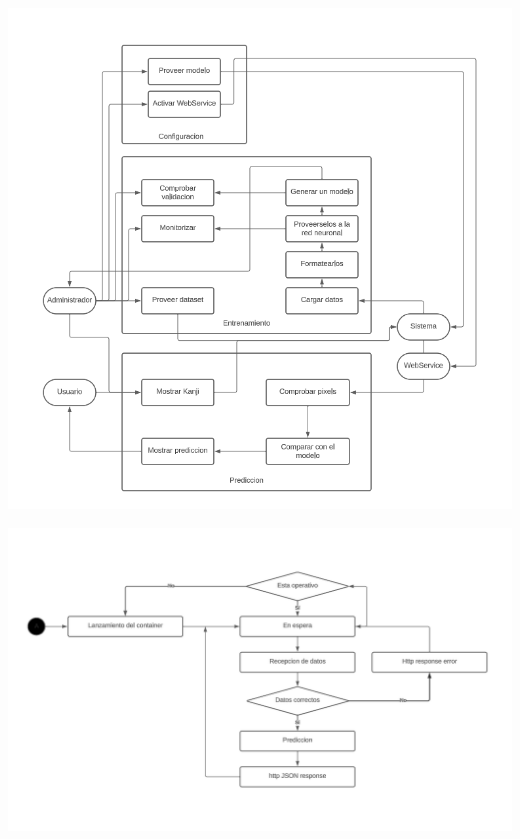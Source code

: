 \documentclass{article}
\begin{document}
	\begin{center}
    	\centering
    	\includegraphics[width=1\textwidth]{pics/UseCases.png}
	\end{center}
	\begin{center}
    	\centering
    	\includegraphics[width=1\textwidth]{pics/State.png}
	\end{center}
\end{document}
